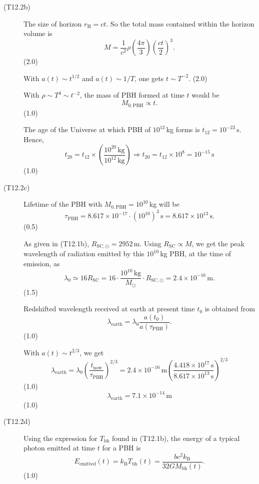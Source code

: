 \begin{description}
\item[(T12.2b)] The size of horizon $r_{\mathrm{H}} = ct$. So the total mass
  contained within the horizon volume is
  \[
    M = \frac{1}{c^2}\rho \left(\frac{4\pi}{3}\right)
      \left(\frac{ct}{2}\right)^3.
  \]
  \hfill(2.0)

  With $a(t) \sim t^{1/2}$ and $a(t) \sim 1/T$, one gets
  $t \sim T^{-2}$. \hfill(2.0)

  With $\rho \sim T^4 \sim t^{-2}$, the mass of PBH formed at time $t$ would
  be
  \[
    M_{0,\mathrm{PBH}} \propto t.
  \]
  \hfill(1.0)

  The age of the Universe at which PBH of $10^{12}$\,kg forms is
  $t_{12} = 10^{-23}$\,s. Hence,
  \[
    t_{20} = t_{12} \times
    \left(\frac{10^{20}\,\mathrm{kg}}{10^{12}\,\mathrm{kg}}\right)
    \Rightarrow t_{20} = t_{12} \times 10^{8} = 10^{-15}\,\mathrm{s}
  \]
  \hfill(1.0)

\item[(T12.2c)] Lifetime of the PBH with
  $M_{0,\mathrm{PBH}} = 10^{10}$\,kg will be
  \[
    \tau_{\mathrm{PBH}} = 8.617 \times 10^{-17} \cdot (10^{10})^3\,\mathrm{s}
    = 8.617 \times 10^{13}\,\mathrm{s}.
  \]
  \hfill(0.5)

  As given in (T12.1b), $R_{\mathrm{SC,\odot}} = 2952$\,m. Using
  $R_{\mathrm{SC}} \propto M$, we get the peak wavelength of radiation
  emitted by this $10^{10}$\,kg PBH, at the time of emission, as
  \[
    \lambda_0 \simeq 16 R_{\mathrm{SC}}
    = 16 \cdot \frac{10^{10}\,\mathrm{kg}}{M_\odot} \cdot
      R_{\mathrm{SC,\odot}}
    = 2.4 \times 10^{-16}\,\mathrm{m}.
  \]
  \hfill(1.5)

  Redshifted wavelength received at earth at present time $t_0$ is obtained
  from
  \[
    \lambda_{\mathrm{earth}}
    = \lambda_0 \frac{a(t_0)}{a(\tau_{\mathrm{PBH}})}.
  \]
  \hfill(1.0)

  With $a(t) \sim t^{2/3}$, we get
  \[
    \lambda_{\mathrm{earth}}
    = \lambda_0 \left(\frac{t_{\mathrm{now}}}{\tau_{\mathrm{PBH}}}\right)^{2/3}
    = 2.4 \times 10^{-16}\,\mathrm{m}
      \left(\frac{4.418 \times 10^{17}\,\mathrm{s}}
        {8.617 \times 10^{13}\,\mathrm{s}}\right)^{2/3}
  \]
  \hfill(1.0)
  \[
    \lambda_{\mathrm{earth}} = 7.1 \times 10^{-14}\,\mathrm{m}
  \]
  \hfill(1.0)

\item[(T12.2d)] Using the expression for $T_{\mathrm{bh}}$ found in
  (T12.1b), the energy of a typical photon emitted at time $t$ for a PBH is
  \[
    E_{\mathrm{emitted}}(t) = k_{\mathrm{B}} T_{\mathrm{bh}}(t)
    = \frac{b c^2 k_{\mathrm{B}}}{32 G M_{\mathrm{bh}}(t)}.
  \]
  \hfill(1.0)


\end{description}
